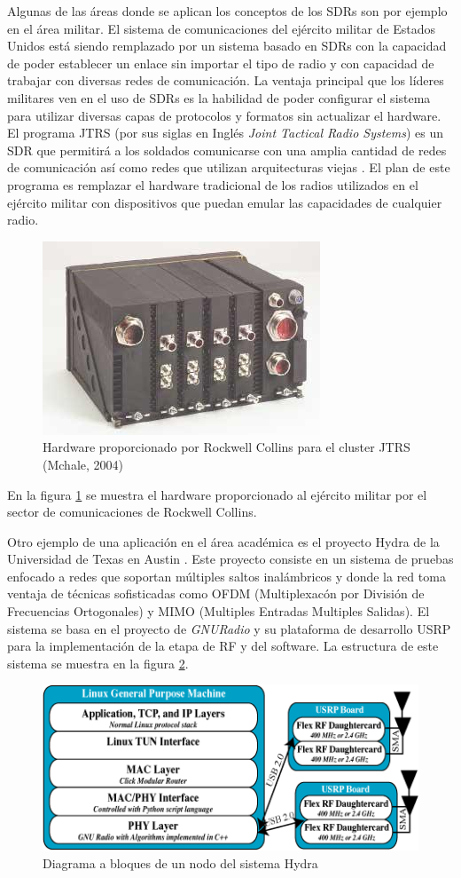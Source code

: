 Algunas de las \'areas donde se aplican los conceptos de los SDRs son por
ejemplo en el \'area militar. El sistema de comunicaciones del ej\'ercito
militar de Estados Unidos est\'a siendo remplazado por un sistema basado en SDRs
con la capacidad de poder establecer un enlace sin importar el tipo de radio y
con capacidad de trabajar con diversas redes de comunicaci\'on. La ventaja
principal que los l\'ideres militares ven en el uso de SDRs es la habilidad de
poder configurar el sistema para utilizar diversas capas de protocolos y
formatos sin actualizar el hardware. El programa JTRS (por sus siglas en Ingl\'es
\emph{Joint Tactical Radio Systems}) es un SDR que permitir\'a a los soldados
comunicarse con una amplia cantidad de redes de comunicaci\'on as\'i como
redes que utilizan arquitecturas viejas \cite{mchale}. El plan de
este programa es remplazar el hardware tradicional de los radios utilizados en
el ej\'ercito militar con dispositivos que puedan emular las capacidades de
cualquier radio.

\begin{figure}[pt]
\centering
	\includegraphics[scale=0.7]{figs/jtrs}
	\caption{Hardware proporcionado por Rockwell Collins para el cluster JTRS
	(Mchale, 2004)}
	\label{fig:jtrs}
\end{figure}

En la figura \ref{fig:jtrs} se muestra el hardware proporcionado al ej\'ercito
militar por el sector de comunicaciones de Rockwell Collins.

Otro ejemplo de una aplicaci\'on en el \'area acad\'emica es el proyecto Hydra
de la Universidad de Texas en Austin \cite{hydra}. Este proyecto consiste en un
sistema de pruebas enfocado a redes que soportan m\'ultiples saltos
inal\'ambricos y donde la red toma ventaja de t\'ecnicas sofisticadas como OFDM (Multiplexac\'on por Divisi\'on de Frecuencias
Ortogonales) y MIMO (Multiples Entradas Multiples Salidas). El sistema se basa en el proyecto de \emph{GNURadio} y su plataforma
de desarrollo USRP \cite{ettus} para la implementaci\'on de la etapa de RF y del
software. La estructura de este sistema se muestra en la figura \ref{fig:hydra}.

\begin{figure}[hpt]
\centering
	\includegraphics[scale=0.7]{figs/hydra}
	\vspace{0.5in}
	\caption{Diagrama a bloques de un nodo del sistema Hydra \protect\cite{hydra}}
	\label{fig:hydra}
\end{figure}
